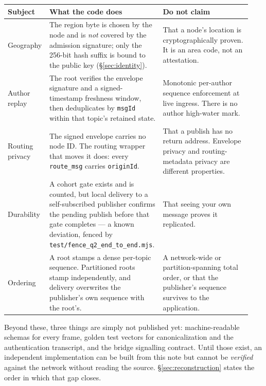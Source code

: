 \documentclass[nobib]{tufte-handout}
\begin{document}
\vspace{0.5em}
\begin{fullwidth}
\small
\begin{tabular}{@{}p{0.14\linewidth}p{0.44\linewidth}p{0.36\linewidth}@{}}
\toprule
\textbf{Subject} & \textbf{What the code does} & \textbf{Do not claim} \\
\midrule
Geography &
The region byte is chosen by the node and is \emph{not} covered by the
admission signature; only the 256-bit hash suffix is bound to the public
key (\S\ref{sec:identity}). &
That a node's location is cryptographically proven. It is an area code,
not an attestation. \\
\addlinespace
Author replay &
The root verifies the envelope signature and a signed-timestamp freshness
window, then deduplicates by \texttt{msgId} within that topic's retained
state. &
Monotonic per-author sequence enforcement at live ingress. There is no
author high-water mark. \\
\addlinespace
Routing privacy &
The signed envelope carries no node ID. The routing wrapper that moves it
does: every \texttt{route\_msg} carries \texttt{originId}. &
That a publish has no return address. Envelope privacy and routing-metadata
privacy are different properties. \\
\addlinespace
Durability &
A cohort gate exists and is counted, but local delivery to a
self-subscribed publisher confirms the pending publish before that gate
completes --- a known deviation, fenced by
\texttt{test/fence\_q2\_end\_to\_end.mjs}. &
That seeing your own message proves it replicated. \\
\addlinespace
Ordering &
A root stamps a dense per-topic sequence. Partitioned roots stamp
independently, and delivery overwrites the publisher's own sequence with
the root's. &
A network-wide or partition-spanning total order, or that the publisher's
sequence survives to the application. \\
\bottomrule
\end{tabular}
\end{fullwidth}
\vspace{0.5em}

Beyond these, three things are simply not published yet: machine-readable
schemas for every frame, golden test vectors for canonicalization and the
authentication transcript, and the bridge signalling contract. Until those
exist, an independent implementation can be built from this note but cannot
be \emph{verified} against the network without reading the source.
\S\ref{sec:reconstruction} states the order in which that gap closes.
\end{document}
